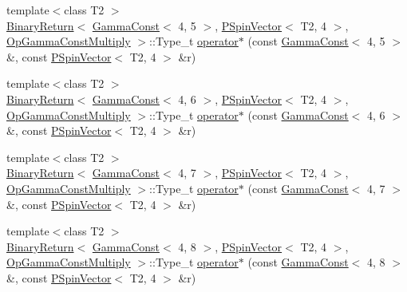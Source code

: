 \begin{DoxyCompactItemize}
\item 
{\footnotesize template$<$class T2 $>$ }\\\mbox{\hyperlink{structENSEM_1_1BinaryReturn}{Binary\+Return}}$<$ \mbox{\hyperlink{classENSEM_1_1GammaConst}{Gamma\+Const}}$<$ 4, 5 $>$, \mbox{\hyperlink{classENSEM_1_1PSpinVector}{P\+Spin\+Vector}}$<$ T2, 4 $>$, \mbox{\hyperlink{structENSEM_1_1OpGammaConstMultiply}{Op\+Gamma\+Const\+Multiply}} $>$\+::Type\+\_\+t \mbox{\hyperlink{group__primspinvector_ga173eb3594c9d1774c080d3df7116efbd}{operator$\ast$}} (const \mbox{\hyperlink{classENSEM_1_1GammaConst}{Gamma\+Const}}$<$ 4, 5 $>$ \&, const \mbox{\hyperlink{classENSEM_1_1PSpinVector}{P\+Spin\+Vector}}$<$ T2, 4 $>$ \&r)
\item 
{\footnotesize template$<$class T2 $>$ }\\\mbox{\hyperlink{structENSEM_1_1BinaryReturn}{Binary\+Return}}$<$ \mbox{\hyperlink{classENSEM_1_1GammaConst}{Gamma\+Const}}$<$ 4, 6 $>$, \mbox{\hyperlink{classENSEM_1_1PSpinVector}{P\+Spin\+Vector}}$<$ T2, 4 $>$, \mbox{\hyperlink{structENSEM_1_1OpGammaConstMultiply}{Op\+Gamma\+Const\+Multiply}} $>$\+::Type\+\_\+t \mbox{\hyperlink{group__primspinvector_gad9a09b9039ac73a95c0893a4bfd306c2}{operator$\ast$}} (const \mbox{\hyperlink{classENSEM_1_1GammaConst}{Gamma\+Const}}$<$ 4, 6 $>$ \&, const \mbox{\hyperlink{classENSEM_1_1PSpinVector}{P\+Spin\+Vector}}$<$ T2, 4 $>$ \&r)
\item 
{\footnotesize template$<$class T2 $>$ }\\\mbox{\hyperlink{structENSEM_1_1BinaryReturn}{Binary\+Return}}$<$ \mbox{\hyperlink{classENSEM_1_1GammaConst}{Gamma\+Const}}$<$ 4, 7 $>$, \mbox{\hyperlink{classENSEM_1_1PSpinVector}{P\+Spin\+Vector}}$<$ T2, 4 $>$, \mbox{\hyperlink{structENSEM_1_1OpGammaConstMultiply}{Op\+Gamma\+Const\+Multiply}} $>$\+::Type\+\_\+t \mbox{\hyperlink{group__primspinvector_ga155a168cc76a655423d76a2ad99776a1}{operator$\ast$}} (const \mbox{\hyperlink{classENSEM_1_1GammaConst}{Gamma\+Const}}$<$ 4, 7 $>$ \&, const \mbox{\hyperlink{classENSEM_1_1PSpinVector}{P\+Spin\+Vector}}$<$ T2, 4 $>$ \&r)
\item 
{\footnotesize template$<$class T2 $>$ }\\\mbox{\hyperlink{structENSEM_1_1BinaryReturn}{Binary\+Return}}$<$ \mbox{\hyperlink{classENSEM_1_1GammaConst}{Gamma\+Const}}$<$ 4, 8 $>$, \mbox{\hyperlink{classENSEM_1_1PSpinVector}{P\+Spin\+Vector}}$<$ T2, 4 $>$, \mbox{\hyperlink{structENSEM_1_1OpGammaConstMultiply}{Op\+Gamma\+Const\+Multiply}} $>$\+::Type\+\_\+t \mbox{\hyperlink{group__primspinvector_gadf1f85c537d85cf1fb2e4dbc24de9d81}{operator$\ast$}} (const \mbox{\hyperlink{classENSEM_1_1GammaConst}{Gamma\+Const}}$<$ 4, 8 $>$ \&, const \mbox{\hyperlink{classENSEM_1_1PSpinVector}{P\+Spin\+Vector}}$<$ T2, 4 $>$ \&r)

\end{DoxyCompactItemize}
